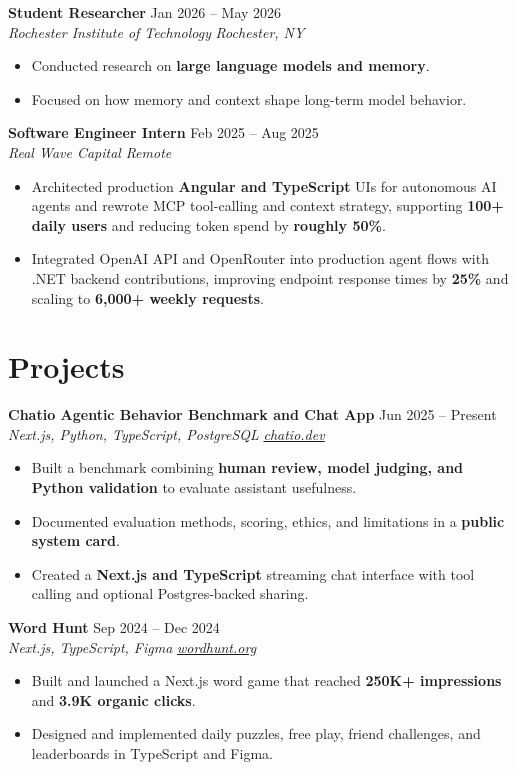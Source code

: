 \documentclass[10pt,letterpaper]{article}
\newif\ifresumeFirstRole
\newcommand{\resumeRole}[4]{%
  \ifresumeFirstRole
    \global\resumeFirstRolefalse
  \else
    \vspace{0pt plus 1fill}%
  \fi
  \textbf{#1} \hfill #2\\
  \textit{#3} \hfill \textit{#4}
}
\begin{document}
\resumeRole{Student Researcher}{Jan 2026 -- May 2026}{Rochester Institute of Technology}{Rochester, NY}
\begin{itemize}
  \item Conducted research on \textbf{large language models and memory}.
  \item Focused on how memory and context shape long-term model behavior.
\end{itemize}

\resumeRole{Software Engineer Intern}{Feb 2025 -- Aug 2025}{Real Wave Capital}{Remote}
\begin{itemize}
  \item Architected production \textbf{Angular and TypeScript} UIs for autonomous AI agents and rewrote MCP tool-calling and context strategy, supporting \textbf{100+ daily users} and reducing token spend by \textbf{roughly 50\%}.
  \item Integrated OpenAI API and OpenRouter into production agent flows with .NET backend contributions, improving endpoint response times by \textbf{25\%} and scaling to \textbf{6,000+ weekly requests}.
\end{itemize}

\section*{Projects}
\resumeRole{Chatio Agentic Behavior Benchmark and Chat App}{Jun 2025 -- Present}{Next.js, Python, TypeScript, PostgreSQL}{\href{https://chatio.dev}{chatio.dev}}
\begin{itemize}
  \item Built a benchmark combining \textbf{human review, model judging, and Python validation} to evaluate assistant usefulness.
  \item Documented evaluation methods, scoring, ethics, and limitations in a \textbf{public system card}.
  \item Created a \textbf{Next.js and TypeScript} streaming chat interface with tool calling and optional Postgres-backed sharing.
\end{itemize}

\resumeRole{Word Hunt}{Sep 2024 -- Dec 2024}{Next.js, TypeScript, Figma}{\href{https://wordhunt.org}{wordhunt.org}}
\begin{itemize}
  \item Built and launched a Next.js word game that reached \textbf{250K+ impressions} and \textbf{3.9K organic clicks}.
  \item Designed and implemented daily puzzles, free play, friend challenges, and leaderboards in TypeScript and Figma.
\end{itemize}
\end{document}
